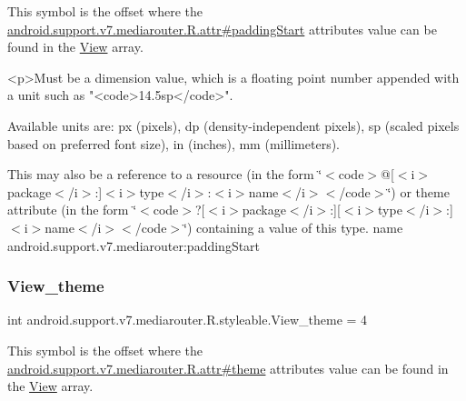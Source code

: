 This symbol is the offset where the \hyperlink{classandroid_1_1support_1_1v7_1_1mediarouter_1_1R_1_1attr_a2f3d96d256743ab34d00d4423d23ea0f}{android.\+support.\+v7.\+mediarouter.\+R.\+attr\#padding\+Start} attribute\textquotesingle{}s value can be found in the \hyperlink{classandroid_1_1support_1_1v7_1_1mediarouter_1_1R_1_1styleable_a69727b595e0fa598a4ad38166ab404a9}{View} array.

\begin{DoxyVerb}      <p>Must be a dimension value, which is a floating point number appended with a unit such as "<code>14.5sp</code>".
\end{DoxyVerb}
 Available units are\+: px (pixels), dp (density-\/independent pixels), sp (scaled pixels based on preferred font size), in (inches), mm (millimeters). 

This may also be a reference to a resource (in the form \char`\"{}$<$code$>$@\mbox{[}$<$i$>$package$<$/i$>$\+:\mbox{]}$<$i$>$type$<$/i$>$\+:$<$i$>$name$<$/i$>$$<$/code$>$\char`\"{}) or theme attribute (in the form \char`\"{}$<$code$>$?\mbox{[}$<$i$>$package$<$/i$>$\+:\mbox{]}\mbox{[}$<$i$>$type$<$/i$>$\+:\mbox{]}$<$i$>$name$<$/i$>$$<$/code$>$\char`\"{}) containing a value of this type.  name android.\+support.\+v7.\+mediarouter\+:padding\+Start \mbox{\label{classandroid_1_1support_1_1v7_1_1mediarouter_1_1R_1_1styleable_ae0961a211c233453ac6649347600b383}} 
\subsubsection{\texorpdfstring{View\+\_\+theme}{View\_theme}}
{\footnotesize\ttfamily int android.\+support.\+v7.\+mediarouter.\+R.\+styleable.\+View\+\_\+theme = 4\hspace{0.3cm}{\ttfamily [static]}}

This symbol is the offset where the \hyperlink{classandroid_1_1support_1_1v7_1_1mediarouter_1_1R_1_1attr_ad067d9f19426f54954ba24757134b5c0}{android.\+support.\+v7.\+mediarouter.\+R.\+attr\#theme} attribute\textquotesingle{}s value can be found in the \hyperlink{classandroid_1_1support_1_1v7_1_1mediarouter_1_1R_1_1styleable_a69727b595e0fa598a4ad38166ab404a9}{View} array.

